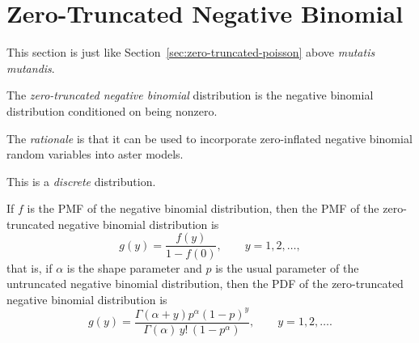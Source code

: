 \section{Zero-Truncated Negative Binomial}
\label{sec:zero-truncated-negative-binomial}

This section is just like Section~\ref{sec:zero-truncated-poisson} above
\emph{mutatis mutandis}.

The \emph{zero-truncated negative binomial} distribution is
the negative binomial distribution conditioned on being nonzero.

The \emph{rationale} is that it can be used to incorporate zero-inflated
negative binomial random variables into aster models.

This is a \emph{discrete} distribution.

\begin{sloppypar}
If $f$ is the PMF of the negative binomial distribution, then the PMF of
the zero-truncated negative binomial distribution is
\begin{equation}
\label{eq:zero-truncated-negative-binomial-pmf-in-terms-of-negative-binomial}
   g(y) = \frac{f(y)}{1 - f(0)},
   \qquad y = 1, 2, \ldots,
\end{equation}
that is, if $\alpha$ is the shape parameter and $p$ is the usual parameter
of the untruncated negative binomial distribution, then
the PDF of the zero-truncated negative binomial distribution is
\begin{equation} \label{eq:zero-truncated-negative-binomial-pmf}
   g(y) =
   \frac{\Gamma(\alpha + y) p^\alpha (1-p)^y}
   {\Gamma(\alpha) \, y! \, (1 - p^\alpha)},
   \qquad y = 1, 2, \ldots.
\end{equation}
\end{sloppypar}

